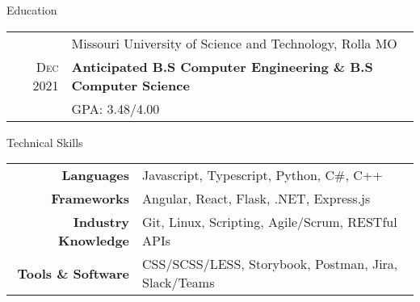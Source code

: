 \documentclass{resume}
\begin{document}
    
\begin{rSection}{Education}
    \small {
    \begin{tabular}{r|p{15cm}}
       & Missouri University of Science and Technology, Rolla MO  \\ 
      \textsc{Dec} 2021 & \textbf{Anticipated B.S Computer Engineering \& B.S Computer Science} \\
      & GPA: 3.48/4.00
    \end{tabular}
    }
\end{rSection}
      
\begin{rSection}{Technical Skills}
  \small
  {
      \begin{tabular}{rl}
      \multicolumn{1}{r|}{\textbf{Languages}} & Javascript, Typescript, Python, C\#, C++ \\
      \multicolumn{1}{r|}{\textbf{Frameworks}} & Angular, React, Flask, .NET, Express.js \\
      \multicolumn{1}{r|}{\textbf{Industry Knowledge}} & Git, Linux, Scripting, Agile/Scrum, RESTful APIs \\
      \multicolumn{1}{r|}{\textbf{Tools \& Software}} & CSS/SCSS/LESS, Storybook, Postman, Jira, Slack/Teams
      \end{tabular}
  }
\end{rSection}
\end{document}
